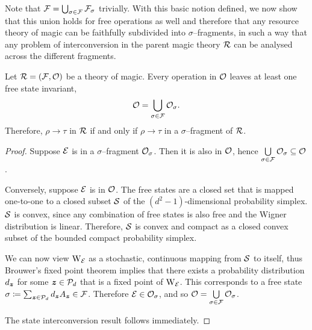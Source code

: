 \documentclass[pra,
aps,
twocolumn,
superscriptaddress,
groupedaddress,
nofootinbib,
reprint
]{revtex4-1}
\begin{document}
Note that $\F = \bigcup_{\sigma \in \F} \F_\sigma$ trivially.
With this basic notion defined, we now show that this union holds for free operations as well and therefore that any resource theory of magic can be faithfully subdivided into $\sigma$--fragments, in such a way that any problem of interconversion in the parent magic theory $\R$ can be analysed across the different fragments.

\begin{theorem}\label{thm:frag}
    Let $\R = (\F, \O)$ be a theory of magic.
    Every operation in $\O$ leaves at least one free state invariant,
  \begin{equation}
\O = \bigcup\limits_{\sigma \in \F} \O_\sigma.
\end{equation}
Therefore, $\rho \longrightarrow \tau$ in $\R$ if and only if $\rho \longrightarrow \tau$ in a $\sigma$--fragment of $\R$.
\end{theorem}
\begin{proof}
    Suppose $\E$ is in a $\sigma$--fragment $\O_\sigma$.
    Then it is also in $\O$, hence $\bigcup\limits_{\sigma \in \F} \O_\sigma \subseteq \O$. 
    
    Conversely, suppose $\E$ is in $\O$. 
    The free states are a closed set that is mapped one-to-one to a closed subset $\cal{S}$ of the $(d^2 - 1)$-dimensional probability simplex.
    $\cal{S}$ is convex, since any combination of free states is also free and the Wigner distribution is linear.
    Therefore, $\cal{S}$ is convex and compact as a closed convex subset of the bounded compact probability simplex.
    
    We can now view $\W{\E}$ as a stochastic, continuous mapping from $\cal{S}$ to itself, thus Brouwer's fixed point theorem  implies that there exists a probability distribution $d_{\bmz}$ for some $ \bmz \in \cal{P}_d$ that is a fixed point of $\W{\E}$.
    This corresponds to a free state $\sigma \coloneqq \sum_{\bmz \in \cal{P}_d} d_{\bmz} A_{\bmz} \in \F$. 
    Therefore $\E \in \O_\sigma$, and so $\O = \bigcup\limits_{\sigma \in \F} \O_\sigma$. 
    
    The state interconversion result follows immediately.
\end{proof}
\end{document}
